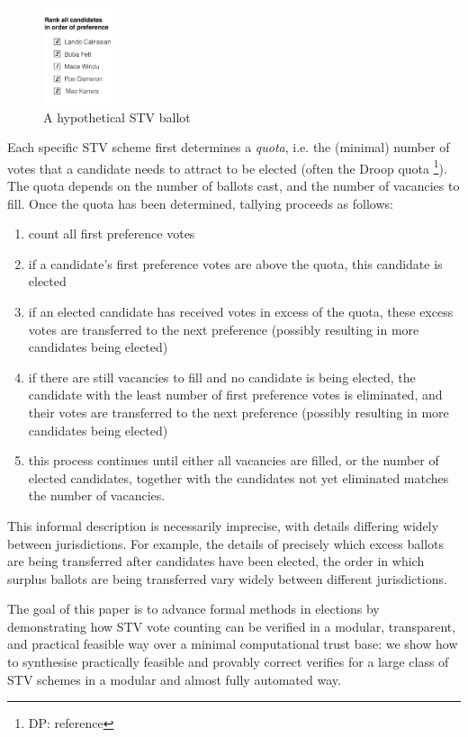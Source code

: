\documentclass[10pt,conference]{IEEEtran}
\begin{document}
\begin{figure}\label{fig:ballot}
\begin{center}
\includegraphics[width=0.18\textwidth]{bal-cropped.pdf}
\end{center}
\caption{A hypothetical STV ballot}
\end{figure}

Each specific STV scheme first determines a \emph{quota}, i.e. the
(minimal) number of votes that a candidate needs to attract to be
elected (often the Droop quota \footnote{DP: reference}). The quota
depends on the number of ballots cast, and the number of vacancies
to fill. Once the quota has been determined, tallying proceeds
as follows:
\begin{enumerate}
  \item count all first preference votes
  \item if a candidate's first preference votes are above the quota,
  this candidate is elected
  \item if an elected candidate has received votes in excess of
  the quota, these  excess votes are transferred to the next preference
  (possibly resulting in more candidates being elected)
  \item if there are still vacancies to fill and no candidate is
  being elected, the candidate with the least number of first
  preference votes is eliminated, and their votes are transferred to
  the next preference (possibly resulting in more candidates being
  elected)
  \item this process continues until either all vacancies are
  filled, or the number of elected candidates, together with the
  candidates not yet eliminated matches the number of vacancies.
\end{enumerate}

This informal description is necessarily imprecise, with details
differing widely between jurisdictions. For example,
the details of precisely which excess ballots are being transferred
after candidates have been elected, the order in which surplus
ballots are being transferred vary widely between different
jurisdictions. 

The goal of this paper is to advance formal methods in elections by
demonstrating how STV vote counting can be verified in a modular,
transparent, and practical feasible way over a minimal computational
trust base:  we show how to synthesise practically feasible and provably correct verifies for a
large class of STV schemes in a modular and almost fully automated
way. 
\end{document}
